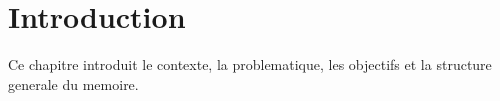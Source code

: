 \chapter{Introduction}

Ce chapitre introduit le contexte, la problematique, les objectifs et la structure generale du memoire.
